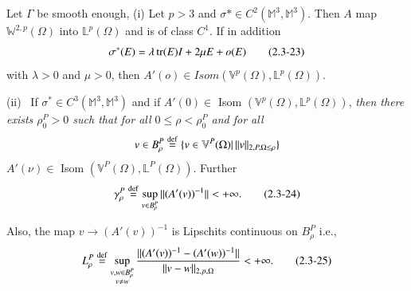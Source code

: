 \begin{theorem}\label{chap2-thm2.3.3}%
  Let $ \Gamma$ be smooth enough, (i)  Let $p > 3$ and $ \sigma
  * \in C^2 (\mathbb{M}^3, \mathbb{M}^3)$. Then $A$ map
  $\mathbb{W}^{2,p}( \Omega)$ into $\mathbb{L}^p ( \Omega) $ and
  is of class $C^1$. If in addition 
\begin{equation*}
\sigma^* (E) = \lambda \operatorname{tr} (E) I + 2 \mu E + o(E) \tag{2.3-23}\label{eq2.3-23}
\end{equation*}
with $\lambda > 0 $ and $ \mu > 0$, then $A' (o) \in Isom (
\mathbb{V}^p ( \Omega ) , \mathbb{L}^p ( \Omega ))$. 

(ii)~ If $\sigma^* \in C^3 ( \mathbb{M}^3 ,\mathbb{M}^3)$ and if
  $A'(0) \in $ Isom $( \mathbb{V}^p(\Omega ) , \mathbb{L}^p( \Omega
  ))$, {\em then there exists $\rho _0 ^P > 0 $ such that for all $0 \leq
  \rho < \rho^P _0 $ and for all} 
 $$
 v \in B_\rho ^P \overset{\operatorname{def}}{=} \{v \in \mathbb{V}^P ( \Omega ) |\, ||
 v ||_{2, P, \Omega \leq \rho}\} 
 $$
 $A'(\nu) \in $ Isom $( \mathbb{V}^P (\Omega ) , \mathbb{L}^P
(\Omega))$. Further 
 \begin{equation*}
   \gamma _{\rho}^{P} \overset{\operatorname{def}}{=} \sup _{v \in B_{\rho}^{P}} ||
   (A' (v ))^{-1} ||< + \infty. \tag{2.3-24} \label{eq2.3-24}
 \end{equation*} 

 Also, the map $v \to (A' (v))^{-1} $ is Lipschits continuous on $B_
 \rho ^P $ i.e., 
 \begin{equation*}
   L_\rho ^P \overset{\operatorname{def}}{=}\sup_{\substack {v, w \in B_\rho ^P \\ v
       \neq w}} \frac{||(A' (v ))^{-1}- (A' (w))^{-1}||}{|| v - w
     ||_{2, p, \Omega}} < + \infty. \tag{2.3-25} \label{eq2.3-25}
 \end{equation*} 
\end{theorem}

